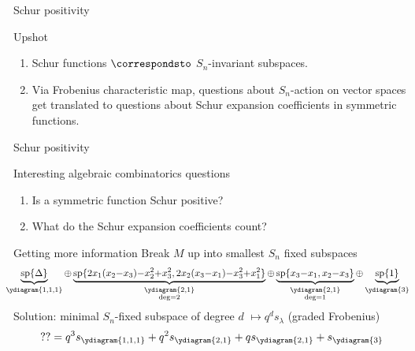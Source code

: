 \documentclass{beamer}
\renewcommand{\Span}{\operatorname{sp}}
\begin{document}
\begin{frame}{Schur positivity}
  \begin{block}{Upshot}
    \begin{enumerate}
      \pause
    \item Schur functions \(\correspondsto\) \(S_n\)-invariant
      subspaces.\pause
    \item Via Frobenius characteristic map, questions about
      \(S_n\)-action on vector spaces get translated to questions
      about Schur expansion coefficients in symmetric functions.
    \end{enumerate}
  \end{block}
\end{frame}
\begin{frame}{Schur positivity}
    \begin{block}{Interesting algebraic combinatorics questions}
    \begin{enumerate}
      \pause
    \item Is a symmetric function Schur positive?
      \pause
    \item What do the Schur expansion coefficients count?
    \end{enumerate}
  \end{block}
\end{frame}
\begin{frame}{Getting more information}
  \pause
  Break \(M\) up into smallest \(S_n\) fixed subspaces 
  \[
    \hspace{-0.75em}
    \scalebox{0.95}{\(
      \underbrace{\Span\{\Delta\}}_{\ydiagram{1,1,1}} {\oplus} \underbrace{\Span\{2x_1(x_2{-}x_3){-}x_2^2{+}x_3^2,
        2x_2(x_3{-}x_1){-}x_3^2{+}x_1^2\}}_{\substack{\ydiagram{2,1}\\\deg
        = 2}} {\oplus}
      \underbrace{\Span\{x_3{-}x_1, x_2{-}x_3\}}_{\substack{\ydiagram{2,1}\\\deg=1}} {\oplus} \underbrace{\Span\{1\}}_{\ydiagram{3}}\)}
  \]
  \pause
  Solution: minimal \(S_n\)-fixed subspace of degree \(d\) \(\mapsto q^d
  s_\lambda\) (graded Frobenius)\[
    ?? = q^3 s_{\ydiagram{1,1,1}} + q^2 s_{\ydiagram{2,1}} + q
    s_{\ydiagram{2,1}} + s_{\ydiagram{3}}
  \]\pause
\end{frame}
\end{document}
